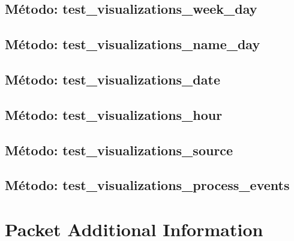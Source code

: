 

\subsection{\quad Método: test\_visualizations\_week\_day}



\subsection{\quad Método: test\_visualizations\_name\_day}



\subsection{\quad Método: test\_visualizations\_date}



\subsection{\quad Método: test\_visualizations\_hour}



\subsection{\quad Método: test\_visualizations\_source}



\subsection{\quad Método: test\_visualizations\_process\_events}



\section{\quad Packet Additional Information}

